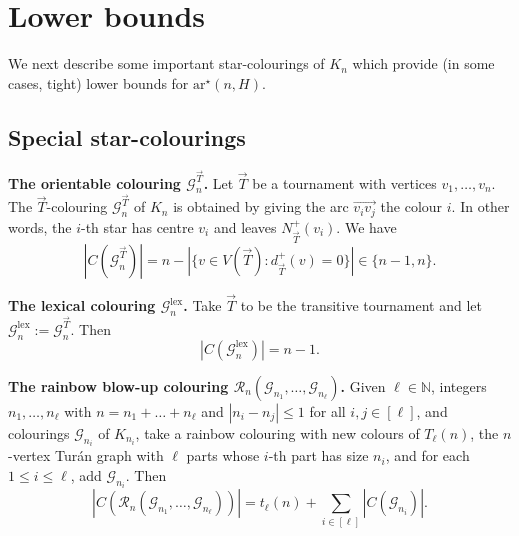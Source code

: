 \documentclass[a4paper, 12pt]{article}
\newcommand{\sG}{lexical }
\numberwithin{equation}{section}
\def\sar{{\mathrm{ar}^{\star}}}
\def\lex{{\mathrm{lex}}}
\newcommand{\ova}[1]{\overrightarrow{#1}}
\newcommand{\ms}[1]{\mathscr{#1}}
\begin{document}
\section{Lower bounds}\label{sec:lower}


We next describe some important star-colourings of $K_n$ which provide (in some cases, tight) lower bounds for $\sar(n,H)$.



\subsection{Special star-colourings}

\noindent
\textbf{The orientable colouring $\ms{G}^{\ova{T}}_n$.}
Let $\ova{T}$ be a tournament with vertices $v_1,\ldots,v_n$.
The $\ova{T}$-colouring $\ms{G}^{\ova{T}}_n$ of $K_n$ is obtained by giving the arc $\overrightarrow{v_iv_j}$ the colour $i$. In other words, the $i$-th star has centre $v_i$ and leaves $N^+_{\ova{T}}(v_i)$. 
We have
\begin{equation}\label{eq:numor}
|C(\ms{G}^{\ova{T}}_n)| = n - |\{v \in V(\ova{T}): d^+_{\ova{T}}(v)=0\}|\in\{n-1,n\}.
\end{equation}


\medskip
\noindent
\textbf{The \sG colouring $\ms{G}^{\lex}_n$.}
Take $\ova{T}$ to be the transitive tournament and let $\ms{G}^{\lex}_n := \ms{G}^{\ova{T}}_n$. Then
\begin{equation}\label{eq:numlex}
|C(\ms{G}^{\lex}_n)| = n - 1.
\end{equation}



\medskip
\noindent
\textbf{The rainbow blow-up colouring $\ms{R}_n(\ms{G}_{n_1},\ldots,\ms{G}_{n_\ell})$.}
Given $\ell \in \mathbb{N}$, integers $n_1,\ldots,n_\ell$ with $n = n_1+\ldots + n_\ell$ and $|n_i-n_j| \leq 1$ for all $i,j \in [\ell]$, and colourings $\ms{G}_{n_i}$ of $K_{n_i}$, take a rainbow colouring with new colours of $T_\ell(n)$, the $n$-vertex Tur\'an graph with $\ell$ parts whose $i$-th part has size $n_i$, and for each $1 \leq i \leq \ell$, add $\ms{G}_{n_i}$.
Then
\begin{equation}\label{eq:numrb}
|C(\ms{R}_n(\ms{G}_{n_1},\ldots,\ms{G}_{n_\ell}))|
= t_{\ell}(n)+\sum_{i \in [\ell]}|C(\ms{G}_{n_i})|.
\end{equation}
\end{document}
